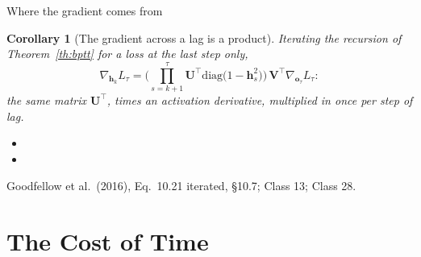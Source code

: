 \documentclass[aspectratio=169, 11pt]{beamer}
\newtheorem{corx}[theorem]{Corollary}
\newcommand{\srcline}[1]{%
  \par\vspace{0.25em}%
  {\scriptsize\color{mcMuted}\hfill #1\par}}
\newcommand{\src}[3]{}      %
\begin{document}
\begin{frame}{Where the gradient comes from}
  \src{goodfellow2016}{equation}{10.21}
  \src{goodfellow2016}{section}{10.7}
  \vspace{-0.45em}
  \begin{corx}[The gradient across a lag is a product]\label{th:product}
    \small
    Iterating the recursion of Theorem~\ref{th:bptt} for a loss at the
    last step only,
    \[
      \nabla_{\mathbf{h}_k}L_\tau
      = \Big( \prod_{s=k+1}^{\tau} \mathbf{U}^{\top}\mathrm{diag}\big(1 - \mathbf{h}_s^2\big) \Big)\,\mathbf{V}^{\top}\nabla_{\mathbf{o}_\tau}L_\tau :
    \]
    the same matrix $\mathbf{U}^{\top}$, times an activation derivative,
    multiplied in once per step of lag.
  \end{corx}
  \vspace{-0.1em}
  {\footnotesize
  \begin{itemize}\itemsep0.12em
    \item {}
    \item {}
  \end{itemize}}
  \vspace{-0.3em}
  \srcline{Goodfellow et al.\ (2016), Eq.~10.21 iterated, \S10.7; Class 13; Class 28.}
\end{frame}



\section{The Cost of Time}
\end{document}
